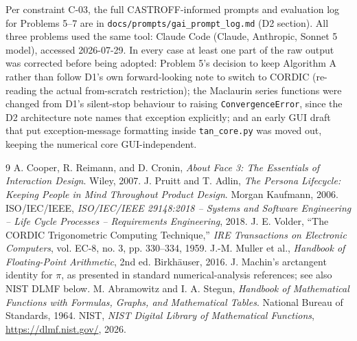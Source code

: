 \documentclass[11pt]{article}
\begin{document}
Per constraint C-03, the full CASTROFF-informed prompts and evaluation log for Problems 5--7 are in \texttt{docs/prompts/gai\_prompt\_log.md} (D2 section). All three problems used the same tool: Claude Code (Claude, Anthropic, Sonnet 5 model), accessed 2026-07-29. In every case at least one part of the raw output was corrected before being adopted: Problem 5's decision to keep Algorithm A rather than follow D1's own forward-looking note to switch to CORDIC (re-reading the actual from-scratch restriction); the Maclaurin series functions were changed from D1's silent-stop behaviour to raising \texttt{ConvergenceError}, since the D2 architecture note names that exception explicitly; and an early GUI draft that put exception-message formatting inside \texttt{tan\_core.py} was moved out, keeping the numerical core GUI-independent.

\begin{thebibliography}{9}
 A. Cooper, R. Reimann, and D. Cronin, \emph{About Face 3: The Essentials of Interaction Design}. Wiley, 2007.
 J. Pruitt and T. Adlin, \emph{The Persona Lifecycle: Keeping People in Mind Throughout Product Design}. Morgan Kaufmann, 2006.
 ISO/IEC/IEEE, \emph{ISO/IEC/IEEE 29148:2018 -- Systems and Software Engineering -- Life Cycle Processes -- Requirements Engineering}, 2018.
 J. E. Volder, ``The CORDIC Trigonometric Computing Technique,'' \emph{IRE Transactions on Electronic Computers}, vol. EC-8, no. 3, pp. 330--334, 1959.
 J.-M. Muller et al., \emph{Handbook of Floating-Point Arithmetic}, 2nd ed. Birkh\"auser, 2016.
 J. Machin's arctangent identity for $\pi$, as presented in standard numerical-analysis references; see also NIST DLMF below.
 M. Abramowitz and I. A. Stegun, \emph{Handbook of Mathematical Functions with Formulas, Graphs, and Mathematical Tables}. National Bureau of Standards, 1964.
 NIST, \emph{NIST Digital Library of Mathematical Functions}, \url{https://dlmf.nist.gov/}, 2026.
\end{thebibliography}
\end{document}
